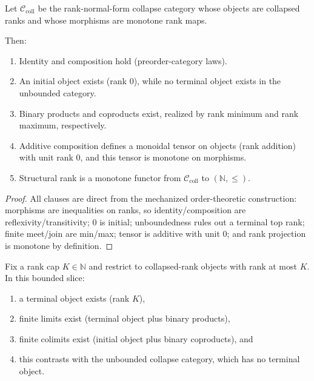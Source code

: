 \begin{theorem}\label{thm:collapsed-rank-category-structure}
Let $\mathcal{C}_{\mathrm{coll}}$ be the rank-normal-form collapse category whose objects are collapsed ranks and whose morphisms are monotone rank maps.

Then:
\begin{enumerate}
\item Identity and composition hold (preorder-category laws).
\item An initial object exists (rank $0$), while no terminal object exists in the unbounded category.
\item Binary products and coproducts exist, realized by rank minimum and rank maximum, respectively.
\item Additive composition defines a monoidal tensor on objects (rank addition) with unit rank $0$, and this tensor is monotone on morphisms.
\item Structural rank is a monotone functor from $\mathcal{C}_{\mathrm{coll}}$ to $(\mathbb{N},\le)$.
\end{enumerate}
\end{theorem}

\begin{proof}
All clauses are direct from the mechanized order-theoretic construction: morphisms are inequalities on ranks, so identity/composition are reflexivity/transitivity; $0$ is initial; unboundedness rules out a terminal top rank; finite meet/join are min/max; tensor is additive with unit $0$; and rank projection is monotone by definition.
\end{proof}

\begin{theorem}\label{thm:bounded-collapsed-rank-finite-colimits}
Fix a rank cap $K\in\mathbb{N}$ and restrict to collapsed-rank objects with rank at most $K$. In this bounded slice:
\begin{enumerate}
\item a terminal object exists (rank $K$),
\item finite limits exist (terminal object plus binary products),
\item finite colimits exist (initial object plus binary coproducts), and
\item this contrasts with the unbounded collapse category, which has no terminal object.
\end{enumerate}
\end{theorem}


